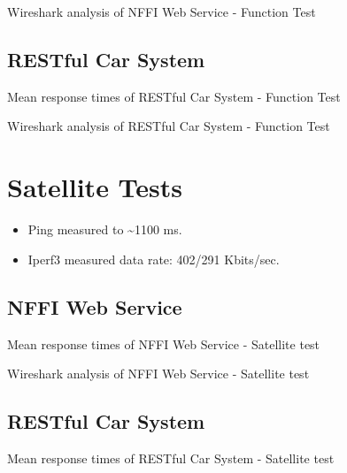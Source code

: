 \begin{appendices}
\begin{table}[H]

\caption{Wireshark analysis of NFFI Web Service - Function Test}
\end{table}

\subsection{RESTful Car System}

\begin{table}[H]

\caption{Mean response times of RESTful Car System - Function Test}
\end{table}

\begin{table}[H]

\caption{Wireshark analysis of RESTful Car System - Function Test}
\end{table}

\section{Satellite Tests}

\begin{itemize}
	\item Ping measured to \textasciitilde 1100 ms.
	\item Iperf3 measured data rate: 402/291 Kbits/sec.
\end{itemize}

\subsection{NFFI Web Service}

\begin{table}[H]

\caption{Mean response times of NFFI Web Service - Satellite test}
\end{table}

\begin{table}[H]

\caption{Wireshark analysis of NFFI Web Service - Satellite test}
\end{table}

\subsection{RESTful Car System}

\begin{table}[H]

\caption{Mean response times of RESTful Car System - Satellite test}
\end{table}


\end{appendices}
